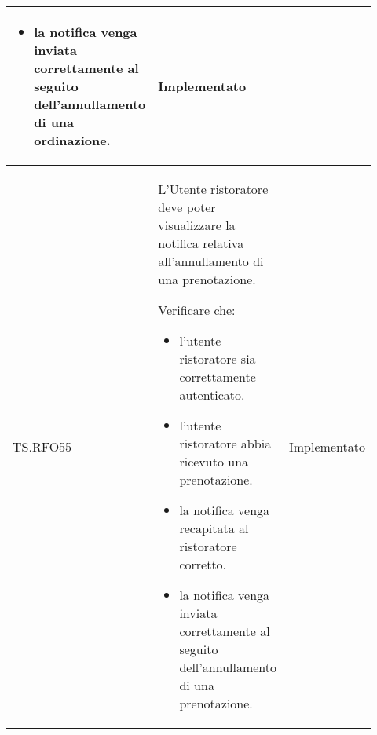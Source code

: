 \begin{longtable}{|p{0.10\linewidth}|p{0.70\linewidth}|p{0.12\linewidth}|}
\begin{itemize}
		\item la notifica venga inviata correttamente al seguito dell'annullamento di una ordinazione.
	\end{itemize}                                  &
	Implementato                                                                                                                                                   \\
	\hline
	TS.RFO55                                                                                                                        &
	L'Utente ristoratore deve poter visualizzare la notifica relativa all'annullamento di una prenotazione. \par
	Verificare che:
	\begin{itemize}
		\item l'utente ristoratore sia correttamente autenticato.
		\item l'utente ristoratore abbia ricevuto una prenotazione.
		\item la notifica venga recapitata al ristoratore corretto.
		\item la notifica venga inviata correttamente al seguito dell'annullamento di una prenotazione.
	\end{itemize}                                 &
	Implementato                                                                                                                                                   \\
	\hline
\end{longtable}

\fontsize{12}{12}\selectfont

